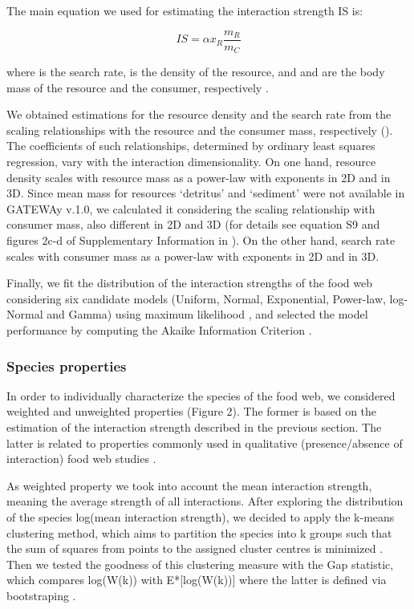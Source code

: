 \documentclass[gc, manuscript]{copernicus}
\begin{document}
The main equation we used for estimating the interaction strength IS is:

\begin{equation}
IS = \alpha x_R \frac{m_R}{m_C}
\end{equation}

where \vec{\alpha} is the search rate,  is the density of the
resource, and  and  are the body mass of the resource
and the consumer, respectively \citep{Pawar2012}.

We obtained estimations for the resource density and the search rate
from the scaling relationships with the resource and the consumer mass,
respectively (\citet{Pawar2012}). The coefficients of such
relationships, determined by ordinary least squares regression, vary
with the interaction dimensionality. On one hand, resource density
scales with resource mass as a power-law with exponents
 in 2D and  in 3D. Since
mean mass for resources `detritus' and `sediment' were not available in
GATEWAy v.1.0, we calculated it considering the scaling relationship
with consumer mass, also different in 2D and 3D (for details see
equation S9 and figures 2c-d of Supplementary Information in
\citet{Pawar2012}). On the other hand, search rate scales with consumer
mass as a power-law with exponents  in 2D and
 in 3D.

Finally, we fit the distribution of the interaction strengths of the
food web considering six candidate models (Uniform, Normal, Exponential,
Power-law, log-Normal and Gamma) using maximum likelihood
\citep{McCallum2008}, and selected the model performance by computing
the Akaike Information Criterion \citep{Burnham2002}.

\subsubsection{Species properties}

In order to individually characterize the species of the food web, we
considered weighted and unweighted properties (Figure 2). The former is
based on the estimation of the interaction strength described in the
previous section. The latter is related to properties commonly used in
qualitative (presence/absence of interaction) food web studies
\citep{Martinez1991, Dunne2002, Borrelli2014}.

As weighted property we took into account the mean interaction strength,
meaning the average strength of all interactions. After exploring the
distribution of the species log(mean interaction strength), we decided
to apply the k-means clustering method, which aims to partition the
species into k groups such that the sum of squares from points to the
assigned cluster centres is minimized \citep{Hartigan1979}. Then we
tested the goodness of this clustering measure with the Gap statistic,
which compares log(W(k)) with E*{[}log(W(k)){]} where the latter is
defined via bootstraping \citep{Tibshirani2001}.
\end{document}
